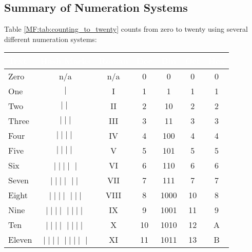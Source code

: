 \subsection{Summary of Numeration Systems}
\label{MF:sub:summary_of_numeration_systems}
Table \ref{MF:tab:counting_to_twenty} counts from zero to twenty using several different numeration systems:

\begin{table}[H]
  \sffamily
  \newcommand{\head}[1]{\textcolor{white}{\textbf{#1}}}
  \begin{center}
    \begin{tabular}{lcccccc} 
      \hline
      \rowcolor{black!75}
      \head{Text} & \head{Hash Marks} & \head{Roman} & \head{Dec} & \head{Bin} 
      & \head{Oct} & \head{Hex} \\ 
      \hline
      Zero      & n/a                           & n/a   & 0  & 0     & 0  & 0 \\ 
      One       & $\mid$                        & I     & 1  & 1     & 1  & 1 \\ 
      Two       & $\mid\mid$                    & II    & 2  & 10    & 2  & 2 \\ 
      Three     & $\mid\mid\mid$                & III   & 3  & 11    & 3  & 3 \\ 
      Four      & $\mid\mid\mid\mid$            & IV    & 4  & 100   & 4  & 4 \\ 
      Five      & \sout{$\mid\mid\mid\mid$} & V     & 5  & 101   & 5  & 5 \\ 
      Six       & \sout{$\mid\mid\mid\mid$}
      $\mid$                                    & VI    & 6  & 110   & 6  & 6 \\ 
      Seven     & \sout{$\mid\mid\mid\mid$}
      $\mid\mid$                                & VII   & 7  & 111   & 7  & 7 \\ 
      Eight     & \sout{$\mid\mid\mid\mid$}
      $\mid\mid\mid$                            & VIII  & 8  & 1000  & 10 & 8 \\ 
      Nine      & \sout{$\mid\mid\mid\mid$}
      $\mid\mid\mid\mid$                        & IX    & 9  & 1001  & 11 & 9 \\ 
      Ten       & \sout{$\mid\mid\mid\mid$}
      \sout{$\mid\mid\mid\mid$}             & X     & 10 & 1010  & 12 & A \\ 
      Eleven    & \sout{$\mid\mid\mid\mid$}
      \sout{$\mid\mid\mid\mid$}
      $\mid$                                    & XI    & 11 & 1011  & 13 & B \\ 

\end{tabular}
\end{center}
\end{table}
